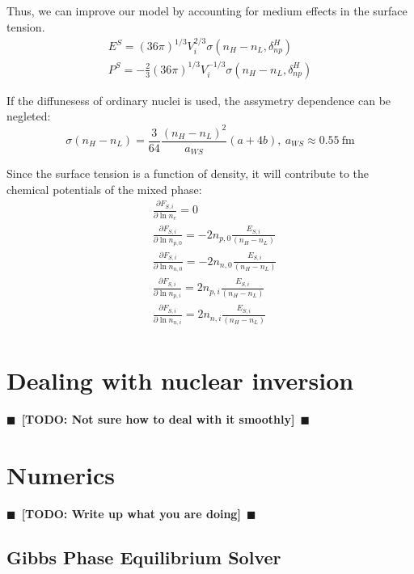 \documentclass[11pt,letter]{article}
\newcommand{\todo}[1]{{$\blacksquare$~\textbf{\color{blue}[TODO: #1]}}~$\blacksquare$}
\begin{document}
Thus, 
we can improve our model by accounting for medium effects in the surface tension.
\begin{equation}
 \begin{split}
  E^S= (36\pi)^{1/3}V_i^{2/3}\sigma(n_H-n_L,\delta^H_{np})\\
  P^S=-\frac{2}{3}(36\pi)^{1/3}V_i^{-1/3}\sigma(n_H-n_L,\delta^H_{np})
 \end{split}
\end{equation}

If the diffunesess of ordinary nuclei is used, the assymetry dependence can be negleted:\
\begin{equation}
 \sigma(n_H-n_L) = \frac{3}{64} \frac{(n_H-n_L)^2}{a_{WS}}  (a  +4 b),\ a_{WS}\approx 0.55\ \text{fm}
\end{equation}

Since the surface tension is a function of density, it will contribute to the chemical potentials of the mixed phase:
\begin{equation}
 \begin{split}
  &\frac{\partial F_{S,i}}{\partial \ln n_e} = 0\\
  &\frac{\partial F_{S,i}}{\partial \ln n_{p,0}} = -2 n_{p,0}\frac{E_{S,i}}{(n_H-n_L)}\\
  &\frac{\partial F_{S,i}}{\partial \ln n_{n,0}} = -2 n_{n,0}\frac{E_{S,i}}{(n_H-n_L)}\\
  &\frac{\partial F_{S,i}}{\partial \ln n_{p,i}} = 2 n_{p,i}\frac{E_{S,i}}{(n_H-n_L)}\\
  &\frac{\partial F_{S,i}}{\partial \ln n_{n,i}} = 2 n_{n,i}\frac{E_{S,i}}{(n_H-n_L)}\\
  \end{split}
\end{equation}


\section{Dealing with nuclear inversion}
\todo{Not sure how to deal with it smoothly} 

\section{Numerics}
\todo{Write up what you are doing} 
\subsection{Gibbs Phase Equilibrium Solver}
\end{document}
